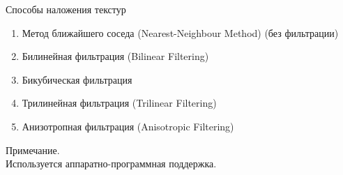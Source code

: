 \documentclass{beamer}
\begin{document}
	\begin{frame}{Способы наложения текстур}

		

		\begin{enumerate}
			\item Метод ближайшего соседа (Nearest-Neighbour Method) (без фильтрации)
			\item Билинейная фильтрация (Bilinear Filtering)
			\item Бикубическая фильтрация 
			\item Трилинейная фильтрация (Trilinear Filtering)
			\item Анизотропная фильтрация (Anisotropic Filtering)
		\end{enumerate}

		Примечание. \\ 
		Используется аппаратно-программная поддержка.\\


	\end{frame}
\end{document}

